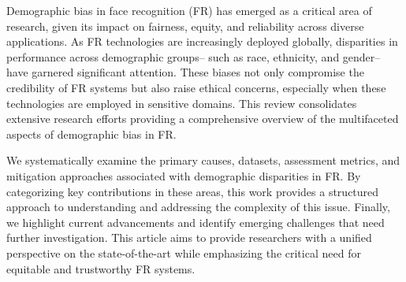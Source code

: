Demographic bias in face recognition (FR) has emerged as a critical area of
research, given its impact on fairness, equity, and reliability across diverse
applications. As FR technologies are increasingly deployed globally, disparities
in performance across demographic groups-- such as race, ethnicity, and gender--
have garnered significant attention. These biases not only compromise the
credibility of FR systems but also raise ethical concerns, especially when these
technologies are employed in sensitive domains. This review consolidates
extensive research efforts providing a comprehensive overview of the
multifaceted aspects of demographic bias in FR.

We systematically examine the primary causes, datasets, assessment metrics, and
mitigation approaches associated with demographic disparities in FR. By
categorizing key contributions in these areas, this work provides a structured
approach to understanding and addressing the complexity of this issue. Finally,
we highlight current advancements and identify emerging challenges that need
further investigation. This article aims to provide researchers with a unified
perspective on the state-of-the-art while emphasizing the critical need for
equitable and trustworthy FR systems. 


